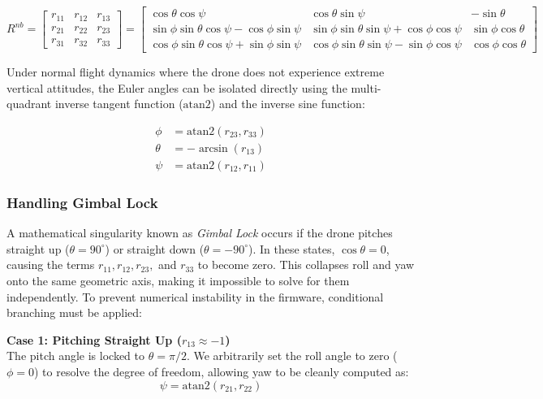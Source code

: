 \documentclass{article}
\begin{document}
\[
R^{nb} = \begin{bmatrix}
	r_{11} & r_{12} & r_{13} \\
	r_{21} & r_{22} & r_{23} \\
	r_{31} & r_{32} & r_{33}
\end{bmatrix} = 
\begin{bmatrix}
	\cos\theta\cos\psi & \cos\theta\sin\psi & -\sin\theta \\
	\sin\phi\sin\theta\cos\psi - \cos\phi\sin\psi & \sin\phi\sin\theta\sin\psi + \cos\phi\cos\psi & \sin\phi\cos\theta \\
	\cos\phi\sin\theta\cos\psi + \sin\phi\sin\psi & \cos\phi\sin\theta\sin\psi - \sin\phi\cos\psi & \cos\phi\cos\theta
\end{bmatrix}
\]

\noindent Under normal flight dynamics where the drone does not experience extreme vertical attitudes, the Euler angles can be isolated directly using the multi-quadrant inverse tangent function ($\text{atan2}$) and the inverse sine function:

\begin{align*}
	\phi   &= \text{atan2}\left(r_{23}, r_{33}\right) \\
	\theta &= -\arcsin\left(r_{13}\right) \\
	\psi   &= \text{atan2}\left(r_{12}, r_{11}\right)
\end{align*}

\subsubsection{Handling Gimbal Lock}

A mathematical singularity known as \emph{Gimbal Lock} occurs if the drone pitches straight up ($\theta = 90^\circ$) or straight down ($\theta = -90^\circ$). In these states, $\cos\theta = 0$, causing the terms $r_{11}, r_{12}, r_{23},$ and $r_{33}$ to become zero. This collapses roll and yaw onto the same geometric axis, making it impossible to solve for them independently. To prevent numerical instability in the firmware, conditional branching must be applied:

\vspace{1em}
\noindent \textbf{Case 1: Pitching Straight Up ($r_{13} \approx -1$)} \\
The pitch angle is locked to $\theta = \pi/2$. We arbitrarily set the roll angle to zero ($\phi = 0$) to resolve the degree of freedom, allowing yaw to be cleanly computed as:
\[
\psi = \text{atan2}\left(r_{21}, r_{22}\right)
\]
\end{document}
